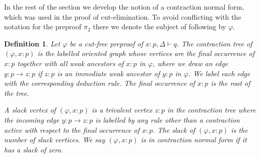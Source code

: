 \documentclass[english,letter paper,12pt,leqno]{article}
\theoremstyle{example}
\newtheorem{definition}[theorem]{Definition}
\numberwithin{equation}{section}
\begin{document}
In the rest of the section we develop the notion of a contraction normal form, which was used in the proof of cut-elimination. To avoid conflicting with the notation for the preproof $\pi_2$ there we denote the subject of following by $\varphi$.

\begin{definition} Let $\varphi$ be a cut-free preproof of $x:p, \Delta \vdash q$. The \emph{contraction tree} of $(\varphi, x:p)$ is the labelled oriented graph whose vertices are the final occurrence of $x:p$ together with all weak ancestors of $x:p$ in $\varphi$, where we draw an edge $y:p \rightarrow z:p$ if $z:p$ is an immediate weak ancestor of $y:p$ in $\varphi$. We label each edge with the corresponding deduction rule. The final occurrence of $x:p$ is the root of the tree.

A \emph{slack vertex} of $(\varphi, x:p)$ is a trivalent vertex $z:p$ in the contraction tree where the incoming edge $y:p \rightarrow z:p$ is labelled by any rule other than a contraction active with respect to the final occurrence of $x:p$. The \emph{slack} of $(\varphi, x:p)$ is the number of slack vertices. We say $(\varphi, x:p)$ is in \emph{contraction normal form} if it has a slack of zero.
\end{definition}
\end{document}
